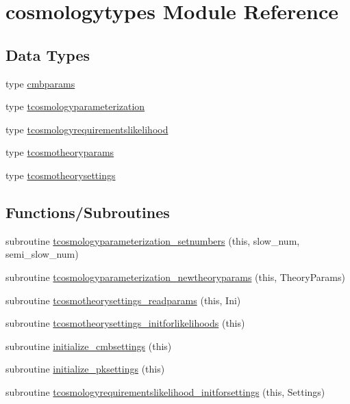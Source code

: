 \hypertarget{namespacecosmologytypes}{}\section{cosmologytypes Module Reference}
\label{namespacecosmologytypes}
\subsection*{Data Types}
\begin{DoxyCompactItemize}
\item 
type \mbox{\hyperlink{structcosmologytypes_1_1cmbparams}{cmbparams}}
\item 
type \mbox{\hyperlink{structcosmologytypes_1_1tcosmologyparameterization}{tcosmologyparameterization}}
\item 
type \mbox{\hyperlink{structcosmologytypes_1_1tcosmologyrequirementslikelihood}{tcosmologyrequirementslikelihood}}
\item 
type \mbox{\hyperlink{structcosmologytypes_1_1tcosmotheoryparams}{tcosmotheoryparams}}
\item 
type \mbox{\hyperlink{structcosmologytypes_1_1tcosmotheorysettings}{tcosmotheorysettings}}
\end{DoxyCompactItemize}
\subsection*{Functions/\+Subroutines}
\begin{DoxyCompactItemize}
\item 
subroutine \mbox{\hyperlink{namespacecosmologytypes_a4dba259c0331d9c0e16d42c55c758719}{tcosmologyparameterization\+\_\+setnumbers}} (this, slow\+\_\+num, semi\+\_\+slow\+\_\+num)
\item 
subroutine \mbox{\hyperlink{namespacecosmologytypes_acc7e28ef33200bc007e793c27f93f5cd}{tcosmologyparameterization\+\_\+newtheoryparams}} (this, Theory\+Params)
\item 
subroutine \mbox{\hyperlink{namespacecosmologytypes_a1a69426bf9f630b4e02bb612ca1406ea}{tcosmotheorysettings\+\_\+readparams}} (this, Ini)
\item 
subroutine \mbox{\hyperlink{namespacecosmologytypes_aea692fd3455be240e80ab5de081b500e}{tcosmotheorysettings\+\_\+initforlikelihoods}} (this)
\item 
subroutine \mbox{\hyperlink{namespacecosmologytypes_a6ff2631493b535981c446bede67a936f}{initialize\+\_\+cmbsettings}} (this)
\item 
subroutine \mbox{\hyperlink{namespacecosmologytypes_a8dba8960e99431585ae2fccadc339a2b}{initialize\+\_\+pksettings}} (this)
\item 
subroutine \mbox{\hyperlink{namespacecosmologytypes_ad425fc0ec36d3dd4e0eab7afb9a1afd8}{tcosmologyrequirementslikelihood\+\_\+initforsettings}} (this, Settings)
\end{DoxyCompactItemize}
